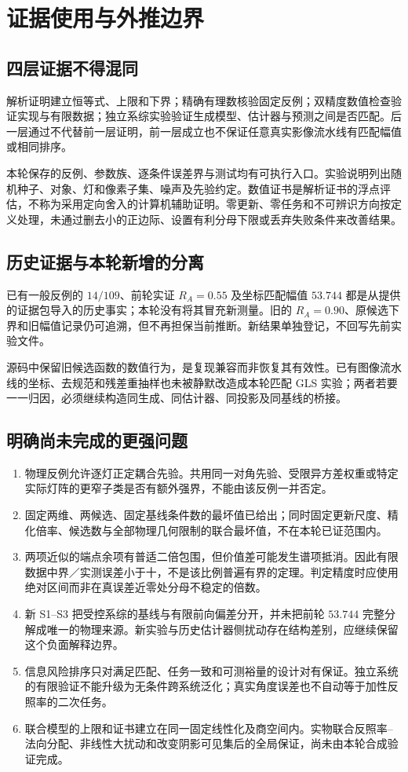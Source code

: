 \section{证据使用与外推边界}
\label{sec:extension-evidence}

\subsection{四层证据不得混同}
解析证明建立恒等式、上限和下界；精确有理数核验固定反例；双精度数值检查验证实现与有限数据；独立系综实验验证生成模型、估计器与预测之间是否匹配。后一层通过不代替前一层证明，前一层成立也不保证任意真实影像流水线有匹配幅值或相同排序。

本轮保存的反例、参数族、逐条件误差界与测试均有可执行入口。实验说明列出随机种子、对象、灯和像素子集、噪声及先验约定。数值证书是解析证书的浮点评估，不称为采用定向舍入的计算机辅助证明。零更新、零任务和不可辨识方向按定义处理，未通过删去小的正边际、设置有利分母下限或丢弃失败条件来改善结果。

\subsection{历史证据与本轮新增的分离}
已有一般反例的 $14/109$、前轮实证 $R_A=0.55$ 及坐标匹配幅值 $53.744$ 都是从提供的证据包导入的历史事实；本轮没有将其冒充新测量。旧的 $R_A=0.90$、原候选下界和旧幅值记录仍可追溯，但不再担保当前推断。新结果单独登记，不回写先前实验文件。

源码中保留旧候选函数的数值行为，是复现兼容而非恢复其有效性。已有图像流水线的坐标、去规范和残差重抽样也未被静默改造成本轮匹配 GLS 实验；两者若要一一归因，必须继续构造同生成、同估计器、同投影及同基线的桥接。

\subsection{明确尚未完成的更强问题}

\begin{enumerate}
\item 物理反例允许逐灯正定耦合先验。共用同一对角先验、受限异方差权重或特定实际灯阵的更窄子类是否有额外强界，不能由该反例一并否定。
\item 固定两维、两候选、固定基线条件数的最坏值已给出；同时固定更新尺度、精化倍率、候选数与全部物理几何限制的联合最坏值，不在本轮已证范围内。
\item 两项近似的端点余项有普适二倍包围，但价值差可能发生谱项抵消。因此有限数据中界／实测误差小于十，不是该比例普遍有界的定理。判定精度时应使用绝对区间而非在真误差近零处分母不稳定的倍数。
\item 新 S1--S3 把受控系综的基线与有限前向偏差分开，并未把前轮 $53.744$ 完整分解成唯一的物理来源。新实验与历史估计器侧扰动存在结构差别，应继续保留这个负面解释边界。
\item 信息风险排序只对满足匹配、任务一致和可测裕量的设计对有保证。独立系统的有限验证不能升级为无条件跨系统泛化；真实角度误差也不自动等于加性反照率的二次任务。
\item 联合模型的上限和证书建立在同一固定线性化及商空间内。实物联合反照率--法向分配、非线性大扰动和改变阴影可见集后的全局保证，尚未由本轮合成验证完成。
\end{enumerate}

